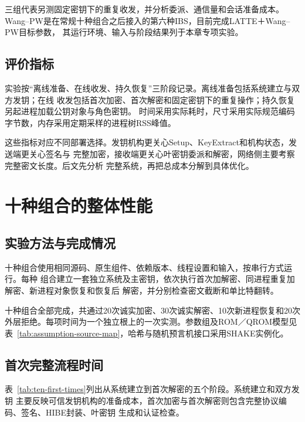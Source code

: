三组代表另测固定密钥下的重复收发，并分析委派、通信量和会话准备成本。Wang--PW是在常规十种组合之后接入的第六种IBS，目前完成LATTE＋Wang--PW目标参数，
其运行环境、输入与阶段结果列于本章专项实验。

\subsection{评价指标}

实验按“离线准备、在线收发、持久恢复”三阶段记录。离线准备包括系统建立与双方发钥；在线
收发包括首次加密、首次解密和固定密钥下的重复操作；持久恢复另起进程加载公钥对象与角色密钥。
时间采用实际耗时，尺寸采用实际规范编码字节数，内存采用定期采样的进程树RSS峰值。

这些指标对应不同部署选择。发钥机构更关心Setup、KeyExtract和机构状态，发送端更关心签名与
完整加密，接收端更关心叶密钥委派和解密，网络侧主要考察完整密文长度。后文先分析
完整系统，再把总成本分解到具体优化。

\section{十种组合的整体性能}

\subsection{实验方法与完成情况}

十种组合使用相同源码、原生组件、依赖版本、线程设置和输入，按串行方式运行。每种
组合建立一套独立系统及主密钥，依次执行首次加解密、同进程重复加解密、新进程对象恢复和恢复后
解密，并分别检查密文截断和单比特翻转。

十种组合全部完成，共通过20次诚实加密、30次诚实解密、10次新进程恢复和20次外层拒绝。每项时间为一个独立根上的一次实测。参数组及ROM／QROM模型见表~\ref{tab:assumption-source-map}，哈希与随机预言机接口采用SHAKE实例化。

\subsection{首次完整流程时间}

表~\ref{tab:ten-first-times}列出从系统建立到首次解密的五个阶段。系统建立和双方发钥
主要反映可信发钥机构的准备成本，首次加密与首次解密则包含完整协议编码、签名、HIBE封装、叶密钥
生成和认证检查。

